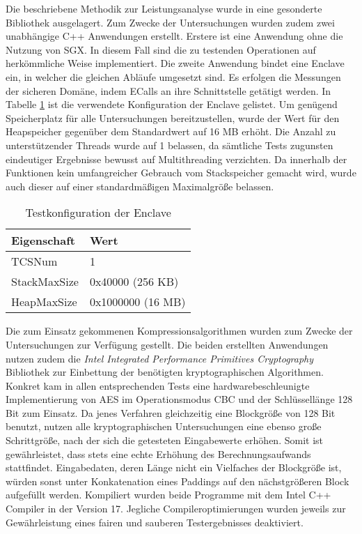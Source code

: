Die beschriebene Methodik zur Leistungsanalyse wurde in eine gesonderte Bibliothek ausgelagert. Zum Zwecke der Untersuchungen wurden zudem zwei unabhängige C++ Anwendungen erstellt. Erstere ist eine Anwendung ohne die Nutzung von \ac{SGX}. In diesem Fall sind die zu testenden Operationen auf herkömmliche Weise implementiert. Die zweite Anwendung bindet eine Enclave ein, in welcher die gleichen Abläufe umgesetzt sind. Es erfolgen die Messungen der sicheren Domäne, indem \acp{ECall} an ihre Schnittstelle getätigt werden. In Tabelle \ref{tab:sgxtestconfig} ist die verwendete Konfiguration der Enclave gelistet. Um genügend Speicherplatz für alle Untersuchungen bereitzustellen, wurde der Wert für den Heapspeicher gegenüber dem Standardwert auf 16 MB erhöht. Die Anzahl zu unterstützender Threads wurde auf 1 belassen, da sämtliche Tests zugunsten eindeutiger Ergebnisse bewusst auf Multithreading verzichten. Da innerhalb der Funktionen kein umfangreicher Gebrauch vom Stackspeicher gemacht wird, wurde auch dieser auf einer standardmäßigen Maximalgröße belassen.
\begin{table}[h]
	\centering
	\caption{Testkonfiguration der Enclave}
	\begin{tabular}{|l|l|}
		\hline
		\textbf{Eigenschaft} & \textbf{Wert} \\
		\hline
		TCSNum & 1 \\
		\hline
		StackMaxSize & 0x40000 (256 KB) \\
		\hline
		HeapMaxSize & 0x1000000 (16 MB) \\
		\hline
	\end{tabular}
	\label{tab:sgxtestconfig}
\end{table}
Die zum Einsatz gekommenen Kompressionsalgorithmen wurden zum Zwecke der Untersuchungen zur Verfügung gestellt. Die beiden erstellten Anwendungen nutzen zudem die \textit{Intel Integrated Performance Primitives Cryptography} Bibliothek zur Einbettung der benötigten kryptographischen Algorithmen. Konkret kam in allen entsprechenden Tests eine hardwarebeschleunigte Implementierung von \ac{AES} im Operationsmodus \ac{CBC} und der Schlüssellänge 128 Bit zum Einsatz. Da jenes Verfahren gleichzeitig eine Blockgröße von 128 Bit benutzt, nutzen alle kryptographischen Untersuchungen eine ebenso große Schrittgröße, nach der sich die getesteten Eingabewerte erhöhen. Somit ist gewährleistet, dass stets eine echte Erhöhung des Berechnungsaufwands stattfindet. Eingabedaten, deren Länge nicht ein Vielfaches der Blockgröße ist, würden sonst unter Konkatenation eines Paddings auf den nächstgrößeren Block aufgefüllt werden. Kompiliert wurden beide Programme mit dem Intel C++ Compiler in der Version 17. Jegliche Compileroptimierungen wurden jeweils zur Gewährleistung eines fairen und sauberen Testergebnisses deaktiviert.

